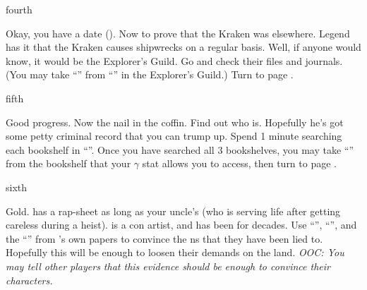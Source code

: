 \documentclass[greennotebook]{NeptuneBall}
\begin{document}
\begin{page}{fourth}

Okay, you have a date (\cKraken{\MYname}). Now to prove that the Kraken was elsewhere. Legend has it that the Kraken causes shipwrecks on a regular basis. Well, if anyone would know, it would be the Explorer's Guild. Go and check their files and journals. (You may take ``\iNorthSeasJournal{}'' from ``\sJournals{}'' in the Explorer's Guild.)  Turn to page .

\end{page}

\begin{page}{fifth}

Good progress. Now the nail in the coffin. Find out who \cLiar{\MYname} is. Hopefully he's got some petty criminal record that you can trump up. Spend 1 minute searching each bookshelf in ``\sMuseum{}''. Once you have searched all 3 bookshelves, you may take ``\iRapSheet{}'' from the bookshelf that your $\gamma$ stat allows you to access, then turn to page .

\end{page}

\begin{page}{sixth}

Gold. \cLiar{\MYname} has a rap-sheet as long as your uncle's (who is serving life after getting careless during a heist). \cLiar{} is a con artist, and has been for decades. Use ``\iNorthSeasJournal{}'', ``\iRapSheet{}'', and the ``\iReference{}'' from \cPrince{}'s own papers to convince the \pPacifica{}ns that they have been lied to. Hopefully this will be enough to loosen their demands on the land. \emph{OOC: You may tell other players that this evidence should be enough to convince their characters.}

\end{page}

\endnotebook
\end{document}
